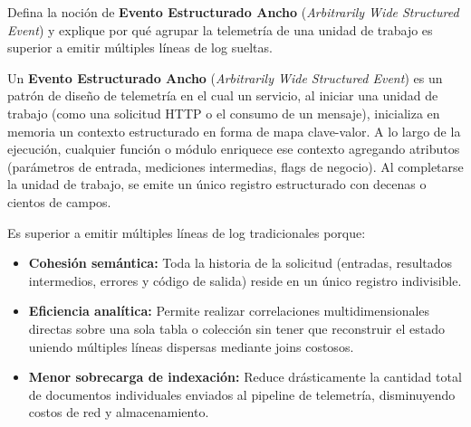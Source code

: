 \documentclass[variant=guia,cover=institutional,mode=screen]{ua-engineering-v6-article}
\begin{document}
\begin{uaexercise}
Defina la noción de \textbf{Evento Estructurado Ancho} (\emph{Arbitrarily Wide Structured Event}) y explique por qué agrupar la telemetría de una unidad de trabajo es superior a emitir múltiples líneas de log sueltas.
\end{uaexercise}
\begin{uaanswer}
Un \textbf{Evento Estructurado Ancho} (\emph{Arbitrarily Wide Structured Event}) es un patrón de diseño de telemetría en el cual un servicio, al iniciar una unidad de trabajo (como una solicitud HTTP o el consumo de un mensaje), inicializa en memoria un contexto estructurado en forma de mapa clave-valor. A lo largo de la ejecución, cualquier función o módulo enriquece ese contexto agregando atributos (parámetros de entrada, mediciones intermedias, flags de negocio). Al completarse la unidad de trabajo, se emite un único registro estructurado con decenas o cientos de campos.

Es superior a emitir múltiples líneas de log tradicionales porque:
\begin{itemize}
\item \textbf{Cohesión semántica:} Toda la historia de la solicitud (entradas, resultados intermedios, errores y código de salida) reside en un único registro indivisible.
\item \textbf{Eficiencia analítica:} Permite realizar correlaciones multidimensionales directas sobre una sola tabla o colección sin tener que reconstruir el estado uniendo múltiples líneas dispersas mediante joins costosos.
\item \textbf{Menor sobrecarga de indexación:} Reduce drásticamente la cantidad total de documentos individuales enviados al pipeline de telemetría, disminuyendo costos de red y almacenamiento.
\end{itemize}
\end{uaanswer}
\end{document}

